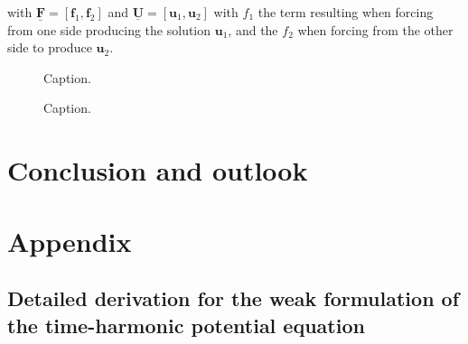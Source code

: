 \documentclass[11pt, a4paper]{article}
\begin{document}
with $\mathbf{\underline{F}} = [\mathbf{f}_1, \mathbf{f}_2]$ and
$\mathbf{\underline{U}} = [\mathbf{u}_1, \mathbf{u}_2]$ with $f_1$ the term
resulting when forcing from one side producing the solution $\mathbf{u}_1$,
and the $f_2$ when forcing from the other side to produce $\mathbf{u}_2$.

\begin{figure}[ht]
    \centering
    
    \caption{Caption.}
    \label{fig:circular-waveguide-scattering}
\end{figure}

\begin{figure}[ht]
    \centering
    
    \caption{Caption.}
    \label{fig:circular-waveguide-error}
\end{figure}

\newpage
\section{Conclusion and outlook}
\label{sec:conclusion}

\newpage


\newpage
\section{Appendix}
\label{sec:appendix}

\subsection{Detailed derivation for the weak formulation of the time-harmonic potential equation}
\label{subsec:derivation}
\end{document}
